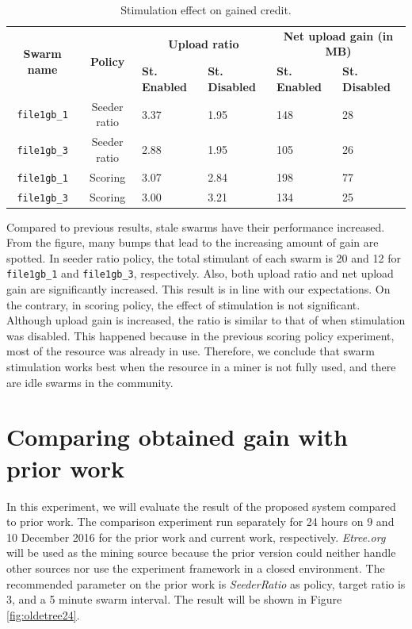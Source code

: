 \begin{table}[h]
	\centering
	\caption{Stimulation effect on gained credit.}
	\label{tbl:stimul}
	\begin{adjustwidth}{-1cm}{}
	\begin{tabular}{|c|c|l|l|l|l|}
		\hline
		\multirow{2}{*}{\textbf{Swarm name}} & \multirow{2}{*}{\textbf{Policy}} & \multicolumn{2}{c|}{\textbf{Upload ratio}} & \multicolumn{2}{c|}{\textbf{Net upload gain (in MB)}} \\ \cline{3-6} 
		&  & \textbf{St. Enabled} & \textbf{St. Disabled} & \textbf{St. Enabled} & \textbf{St. Disabled} \\ \hline
		\texttt{file1gb\_1} & Seeder ratio & 3.37 & 1.95 & 148 & 28 \\ \hline
		\texttt{file1gb\_3} & Seeder ratio & 2.88 & 1.95 & 105 & 26 \\ \hline
		\texttt{file1gb\_1} & Scoring & 3.07 & 2.84 & 198 & 77 \\ \hline
		\texttt{file1gb\_3} & Scoring & 3.00 & 3.21 & 134 & 25 \\ \hline
	\end{tabular}
\end{adjustwidth}
\end{table}

Compared to previous results, stale swarms have  their performance increased. From the figure, many bumps that lead to the increasing amount of gain are spotted. In seeder ratio policy, the total stimulant of each swarm is 20 and 12 for \texttt{file1gb\_1} and \texttt{file1gb\_3}, respectively. Also, both upload ratio and net upload gain are significantly increased. This result is in line with our expectations. On the contrary, in scoring policy, the effect of stimulation is not significant. Although upload gain is increased, the ratio is similar to that of when stimulation was disabled. This happened because in the previous scoring policy experiment, most of the resource was already in use. Therefore, we conclude that swarm stimulation works best when the resource in a miner is not fully used, and there are idle swarms in the community.

\vspace{-0.3cm} 
\section{Comparing obtained gain with prior work}
In this experiment, we will evaluate the result of the proposed system compared to prior work. The comparison experiment run separately for 24 hours on 9 and 10 December 2016 for the prior work and current work, respectively. \textit{Etree.org} will be used as the mining source because the prior version could neither handle other sources nor use the experiment framework in a closed environment. The recommended parameter on the prior work is \textit{SeederRatio} as policy, target ratio is 3, and a 5 minute swarm interval. The result will be shown in Figure \ref{fig:oldetree24}.

